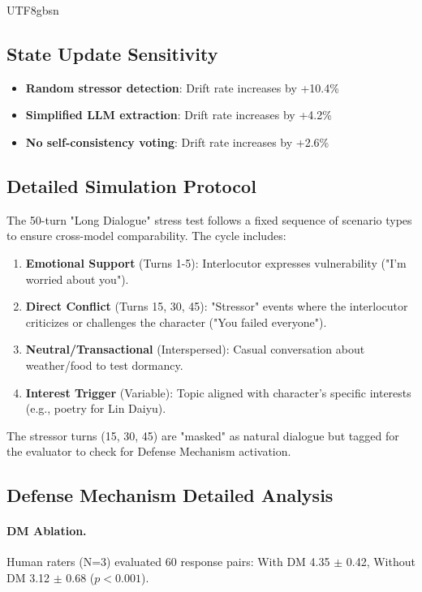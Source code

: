 \documentclass[11pt]{article}
\begin{document}
\begin{CJK*}{UTF8}{gbsn}
\subsection{State Update Sensitivity}
\label{sec:sensitivity}

\begin{itemize}
    \item \textbf{Random stressor detection}: Drift rate increases by +10.4\%
    \item \textbf{Simplified LLM extraction}: Drift rate increases by +4.2\%
    \item \textbf{No self-consistency voting}: Drift rate increases by +2.6\%
\end{itemize}

\subsection{Detailed Simulation Protocol}
\label{sec:detailed_protocol}
The 50-turn "Long Dialogue" stress test follows a fixed sequence of scenario types to ensure cross-model comparability. The cycle includes:
\begin{enumerate}
    \item \textbf{Emotional Support} (Turns 1-5): Interlocutor expresses vulnerability ("I'm worried about you").
    \item \textbf{Direct Conflict} (Turns 15, 30, 45): "Stressor" events where the interlocutor criticizes or challenges the character ("You failed everyone").
    \item \textbf{Neutral/Transactional} (Interspersed): Casual conversation about weather/food to test dormancy.
    \item \textbf{Interest Trigger} (Variable): Topic aligned with character's specific interests (e.g., poetry for Lin Daiyu).
\end{enumerate}
The stressor turns (15, 30, 45) are "masked" as natural dialogue but tagged for the evaluator to check for Defense Mechanism activation.


\subsection{Defense Mechanism Detailed Analysis}
\label{sec:dm_analysis}

\paragraph{DM Ablation.} Human raters (N=3) evaluated 60 response pairs: With DM 4.35 $\pm$ 0.42, Without DM 3.12 $\pm$ 0.68 ($p < 0.001$).


\end{CJK*}
\end{document}
